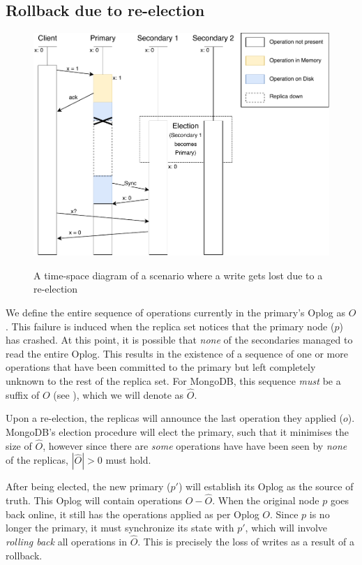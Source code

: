 \subsection{Rollback due to re-election}
\begin{figure}[H]
    \centering
    \includegraphics{images/reelection.pdf}
    \label{fig:reelection}
    \caption{A time-space diagram of a scenario where a write gets lost due to a re-election}
\end{figure}

We define the entire sequence of operations currently in the primary's Oplog as $O$. This failure is induced when the replica set notices that the primary node ($p$) has crashed. At this point, it is possible that \textit{none} of the secondaries managed to read the entire Oplog. This results in the existence of a sequence of one or more operations that have been committed to the primary but left completely unknown to the rest of the replica set. For MongoDB, this sequence \textit{must} be a suffix of $O$ (see ), which we will denote as $\hat{O}$.

Upon a re-election, the replicas will announce the last operation they applied ($o$). MongoDB's election procedure will elect the primary, such that it minimises the size of $\hat{O}$, however since there are \textit{some} operations have have been seen by \textit{none} of the replicas, $|\hat{O}| > 0$ must hold. 

After being elected, the new primary ($p'$) will establish its Oplog as the source of truth. This Oplog will contain operations $O - \hat{O}$. When the original node $p$ goes back online, it still has the operations applied as per Oplog $O$. Since $p$ is no longer the primary, it must synchronize its state with $p'$, which will involve \textit{rolling back} all operations in $\hat{O}$. This is precisely the loss of writes as a result of a rollback.

